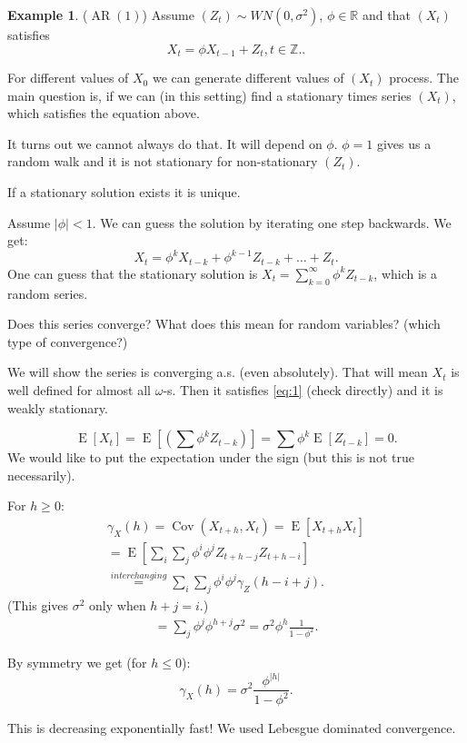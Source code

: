 \documentclass[12pt,a4paper, notitlepage]{book}
\theoremstyle{definition} %
\newtheorem{example}[definition]{Example}
\theoremstyle{plain} %
\newcommand{\R}{\mathbb R}
\newcommand{\Z}{\mathbb Z}
\DeclareMathOperator{\Cov}{Cov}
\DeclareMathOperator{\E}{E}
\DeclareMathOperator{\Ar}{AR}
\begin{document}
\begin{example} ($\Ar(1)$)
Assume $(Z_t) \sim WN(0, \sigma^2)$, $\phi \in \R$ and that $(X_t)$ satisfies 
\[  X_t = \phi X_{t-1} +Z_t, t \in \Z .  \label{eq:1} .\] 


For different values of $X_0$ we can generate different values of $(X_t)$ process. The main question is, if we can (in this setting) find a stationary times series $(X_t)$, which satisfies
the equation above.

It turns out we cannot always do that. It will depend on $\phi$. $\phi = 1$ gives us a random walk and it is not stationary for non-stationary $(Z_t)$.

If a stationary solution exists it is unique.

Assume $|\phi| < 1$. We can guess the solution by iterating one step backwards. We get:
\[ X_t = \phi^k X_{t-k} + \phi^{k-1}Z_{t-k} + \dots + Z_t  . \] 
One can guess that the stationary solution   is $X_t = \sum_{k = 0}^\infty \phi^k Z_{t-k}$, which is a random series. 

Does this series converge? What does this mean for random variables? (which type of convergence?) 

We will show the series is converging a.s. (even absolutely). That will mean $X_t$ is well defined for almost all $\omega$-s. Then it satisfies  
\ref{eq:1} (check directly) and it is weakly stationary. 

\[ \E[X_t] = \E\left[\left(\sum \phi^k Z_{t-k} \right) \right] = \sum \phi^k \E[Z_{t-k}] = 0 . \] 
We would like to put the expectation under the sign (but this is not true necessarily). 

For $h \geq 0$: 
\begin{align*} \gamma_X(h) = \Cov(X_{t +h }, X_t) = \E \left[X_{t+h}X_t \right] \\ 
= \E \left[ \sum_i \sum_j \phi^i \phi^j Z_{t + h - j} Z_{t + h - i} \right] \\ 
\overset{interchanging}{=}   \sum_i \sum _j \phi^i \phi^j \gamma_Z(h-i+j). \end{align*}
(This gives $\sigma^2$ only when $h+j = i$.)
\begin{align*} = \sum_j \phi^j \phi^{h + j}\sigma^2 = \sigma^2 \phi^h \frac{1}{1 - \phi^2}. \end{align*}

By symmetry we get (for $h \leq 0$):
\[ \gamma_X(h) = \sigma^2 \frac{\phi^{|h|}}{1 - \phi^2} . \]

This is decreasing exponentially fast! We used Lebesgue dominated convergence.



\end{example}
\end{document}
